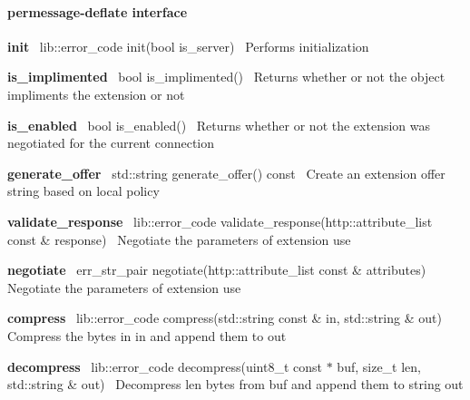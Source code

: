 \paragraph*{permessage-\/deflate interface}

{\bfseries init}~\newline
{\ttfamily lib\+::error\+\_\+code init(bool is\+\_\+server)}~\newline
Performs initialization

{\bfseries is\+\_\+implimented}~\newline
{\ttfamily bool is\+\_\+implimented()}~\newline
Returns whether or not the object impliments the extension or not

{\bfseries is\+\_\+enabled}~\newline
{\ttfamily bool is\+\_\+enabled()}~\newline
Returns whether or not the extension was negotiated for the current connection

{\bfseries generate\+\_\+offer}~\newline
{\ttfamily std\+::string generate\+\_\+offer() const}~\newline
Create an extension offer string based on local policy

{\bfseries validate\+\_\+response}~\newline
{\ttfamily lib\+::error\+\_\+code validate\+\_\+response(http\+::attribute\+\_\+list const \& response)}~\newline
Negotiate the parameters of extension use

{\bfseries negotiate}~\newline
{\ttfamily err\+\_\+str\+\_\+pair negotiate(http\+::attribute\+\_\+list const \& attributes)}~\newline
Negotiate the parameters of extension use

{\bfseries compress}~\newline
{\ttfamily lib\+::error\+\_\+code compress(std\+::string const \& in, std\+::string \& out)}~\newline
Compress the bytes in {\ttfamily in} and append them to {\ttfamily out}

{\bfseries decompress}~\newline
{\ttfamily lib\+::error\+\_\+code decompress(uint8\+\_\+t const $\ast$ buf, size\+\_\+t len, std\+::string \& out)}~\newline
Decompress {\ttfamily len} bytes from {\ttfamily buf} and append them to string {\ttfamily out} 